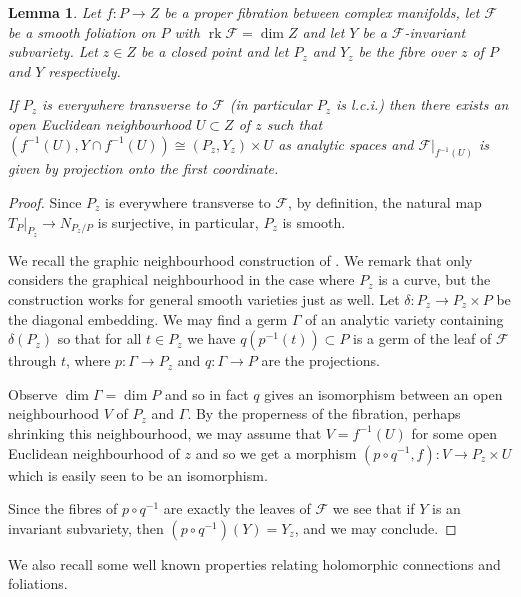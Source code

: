 \documentclass[12pt]{amsart}
\theoremstyle{plain}
\newtheorem{lemma}[theorem]{Lemma}
\theoremstyle{definition}
\def\dim{\operatorname{dim}}
\def\rk{\operatorname{rk}}
\begin{document}
\begin{lemma}
\label{lem_transverse_to_locally trivial}
Let $f\colon P \rightarrow Z$ be a proper fibration between complex manifolds, let $\mathcal F$
be a smooth foliation on $P$ with $\rk \mathcal F = \dim Z$ 
and let $Y$ be a $\mathcal F$-invariant subvariety.  
Let $z \in Z$ be a closed point and let $P_z$ and $Y_z$ be the fibre
over $z$ of $P$ and $Y$ respectively.
  
If $P_z$ is everywhere transverse to $\mathcal F$ (in particular $P_z$ is l.c.i.) then there exists an open Euclidean neighbourhood
$U\subset Z$ of $z$
such that $(f^{-1}(U), Y \cap f^{-1}(U)) \cong (P_z, Y_z) \times U$ as analytic spaces and 
$\mathcal F\vert_{f^{-1}(U)}$ is given by projection onto the first coordinate.
\end{lemma}
\begin{proof}
Since $P_z$ is everywhere transverse to $\mathcal F$, by definition, the natural map $T_P\vert_{P_z} \rightarrow N_{P_z/P}$
is surjective, in particular, $P_z$ is smooth.


We recall the graphic neighbourhood construction of \cite[\S~2.1]{bm16}.  
We remark that \cite{bm16} only considers
the graphical neighbourhood in the case where $P_z$ is a curve, 
but the construction works for general smooth
varieties just as well.
Let $\delta \colon P_z \rightarrow P_z \times P$
be the diagonal embedding.  We may find a germ $\Gamma$ of an analytic variety containing $\delta(P_z)$
so that for all $t \in P_z$ we have $q(p^{-1}(t)) \subset P$ is a germ of the leaf of $\mathcal F$ through $t$,
where $p\colon \Gamma \rightarrow P_z$ and $q\colon \Gamma \rightarrow P$ are the projections.

Observe $\dim \Gamma = \dim P$
and so in fact $q$ gives an isomorphism between an open neighbourhood $V$ of $P_z$ and $\Gamma$.
By the properness of the fibration, perhaps shrinking this neighbourhood, 
we may assume that $V = f^{-1}(U)$ for some open 
Euclidean neighbourhood of $z$
and so
we get a morphism $(p\circ q^{-1}, f)\colon V \rightarrow P_z \times U$ which is easily seen to be an isomorphism.
 
Since the fibres of $p\circ q^{-1}$ are exactly 
the leaves of $\mathcal F$ we see that if $Y$ is an invariant subvariety, then $(p\circ q^{-1})(Y) = Y_z$,
and we may conclude.
\end{proof}



We also recall some well known properties relating holomorphic connections and foliations.
\end{document}

